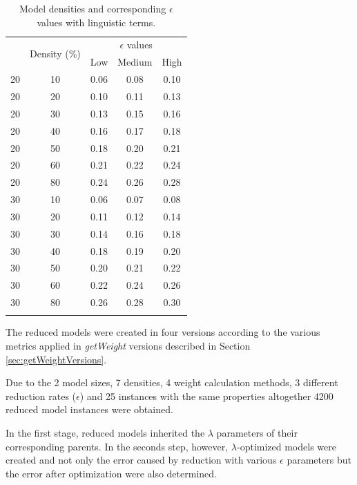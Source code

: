 \documentclass[graybox]{svmult}
\begin{document}
\begin{table}[!t]
  \caption{Model densities and corresponding $\epsilon$ values with linguistic terms.}
  \label{tbl:epsilonDensities}
  \centering
  \begin{tabular}{ccccc}
    \hline\noalign{\smallskip}
    \multirow{2}{*}{No. of concepts} & \multirow{2}{*}{Density (\%)} & \multicolumn{3}{c}{$\epsilon$ values} \\
    \cline{3-5}
    & & Low & Medium & High \\
    \noalign{\smallskip}\svhline\noalign{\smallskip}
    20 & 10 & 0.06 & 0.08 & 0.10 \\
    20 & 20 & 0.10 & 0.11 & 0.13 \\
    20 & 30 & 0.13 & 0.15 & 0.16 \\
    20 & 40 & 0.16 & 0.17 & 0.18 \\
    20 & 50 & 0.18 & 0.20 & 0.21 \\
    20 & 60 & 0.21 & 0.22 & 0.24 \\
    20 & 80 & 0.24 & 0.26 & 0.28 \\
    30 & 10 & 0.06 & 0.07 & 0.08 \\
    30 & 20 & 0.11 & 0.12 & 0.14 \\
    30 & 30 & 0.14 & 0.16 & 0.18 \\
    30 & 40 & 0.18 & 0.19 & 0.20 \\
    30 & 50 & 0.20 & 0.21 & 0.22 \\
    30 & 60 & 0.22 & 0.24 & 0.26 \\
    30 & 80 & 0.26 & 0.28 & 0.30 \\
    \noalign{\smallskip}\hline\noalign{\smallskip}
  \end{tabular}
\end{table}

The reduced models were created in four versions according to the 
various metrics applied in \emph{getWeight} versions described 
in Section \ref{sec:getWeightVersions}. 

Due to the 2 model sizes, 7 densities, 4 weight calculation methods, 3 
different reduction rates ($\epsilon$) and 25 instances with the same 
properties altogether 4200 reduced model instances were obtained.

In the first stage, reduced models inherited the $\lambda$ parameters 
of their corresponding parents. In the seconds step, however, 
$\lambda$-optimized models were created and not only the error caused 
by reduction with various $\epsilon$ parameters but the error after 
optimization were also determined.
\end{document}
